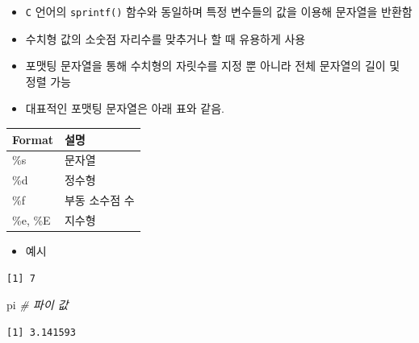 \documentclass[
  11pt,
]{krantz}
\newenvironment{Shaded}{\begin{snugshade}}{\end{snugshade}}
\newcommand{\CommentTok}[1]{\textcolor[rgb]{0.37,0.37,0.37}{\textit{#1}}}
\newcommand{\KeywordTok}[1]{\textcolor[rgb]{0.27,0.27,0.27}{\textbf{#1}}}
\newcommand{\NormalTok}[1]{#1}
\newcommand{\OperatorTok}[1]{\textcolor[rgb]{0.43,0.43,0.43}{\textbf{#1}}}
\newcommand{\StringTok}[1]{\textcolor[rgb]{0.5,0.5,0.5}{#1}}
\providecommand{\tightlist}{%
  \setlength{\itemsep}{0pt}\setlength{\parskip}{0pt}}
\begin{document}
\begin{itemize}
\tightlist
\item
  \texttt{C} 언어의 \texttt{sprintf()} 함수와 동일하며 특정 변수들의 값을 이용해 문자열을 반환함
\item
  수치형 값의 소숫점 자리수를 맞추거나 할 때 유용하게 사용
\item
  포맷팅 문자열을 통해 수치형의 자릿수를 지정 뿐 아니라 전체 문자열의 길이 및 정렬 가능
\item
  대표적인 포맷팅 문자열은 아래 표와 같음.
\end{itemize}

\footnotesize

\begin{tabular}{l|l}
\hline
Format & 설명\\
\hline
\%s & 문자열\\
\hline
\%d & 정수형\\
\hline
\%f & 부동 소수점 수\\
\hline
\%e, \%E & 지수형\\
\hline
\end{tabular}

\normalsize

\begin{itemize}
\tightlist
\item
  예시
\end{itemize}

\footnotesize

\begin{Shaded}
\end{Shaded}

\begin{verbatim}
[1] 7
\end{verbatim}

\begin{Shaded}
\begin{Highlighting}[]
\NormalTok{pi }\CommentTok{# 파이 값}
\end{Highlighting}
\end{Shaded}

\begin{verbatim}
[1] 3.141593
\end{verbatim}

\begin{Shaded}
\end{Shaded}
\end{document}
